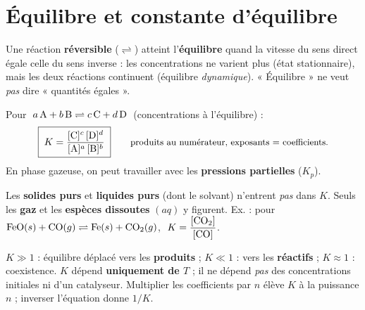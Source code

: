\documentclass[11pt,a4paper]{article}
\begin{document}
\begin{center}
\end{center}

\section{Équilibre et constante d'équilibre}

\begin{definitionb}
Une réaction \textbf{réversible} ($\rightleftharpoons$) atteint l'\textbf{équilibre} quand la vitesse du
sens direct égale celle du sens inverse : les concentrations ne varient plus (état stationnaire), mais les
deux réactions continuent (équilibre \emph{dynamique}). « Équilibre » ne veut \emph{pas} dire « quantités égales ».
\end{definitionb}

\begin{formuleb}
Pour $\;a\,\ce{A} + b\,\ce{B} \rightleftharpoons c\,\ce{C} + d\,\ce{D}\;$ (concentrations à l'équilibre) :
\[ \boxed{\;K = \dfrac{[\ce{C}]^{c}\,[\ce{D}]^{d}}{[\ce{A}]^{a}\,[\ce{B}]^{b}}\;} \qquad
   \text{\small produits au numérateur, exposants = coefficients.} \]
En phase gazeuse, on peut travailler avec les \textbf{pressions partielles} ($K_p$).
\end{formuleb}

\begin{attentionb}
Les \textbf{solides purs} et \textbf{liquides purs} (dont le solvant) n'entrent \emph{pas} dans $K$. Seuls
les \textbf{gaz} et les \textbf{espèces dissoutes} $(aq)$ y figurent. Ex. : pour
$\ce{FeO}(s) + \ce{CO}(g) \rightleftharpoons \ce{Fe}(s) + \ce{CO2}(g)$, $\;K = \dfrac{[\ce{CO2}]}{[\ce{CO}]}$.
\end{attentionb}

\begin{theoremeb}
$K \gg 1$ : équilibre déplacé vers les \textbf{produits} ; $K \ll 1$ : vers les \textbf{réactifs} ;
$K \approx 1$ : coexistence. \;
$K$ dépend \textbf{uniquement de $T$} ; il ne dépend \emph{pas} des concentrations initiales ni d'un
catalyseur. Multiplier les coefficients par $n$ élève $K$ à la puissance $n$ ; inverser l'équation donne $1/K$.
\end{theoremeb}
\end{document}
